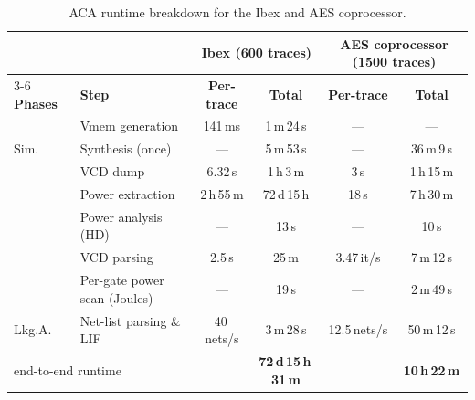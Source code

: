 \documentclass[sigconf]{acmart}
\begin{document}
{
\renewcommand{\arraystretch}{0.9}

\begin{table}[t]
\centering
\setlength{\tabcolsep}{8pt}
\caption{ACA runtime breakdown for the Ibex and AES coprocessor.}
\label{tab:runtime_breakdown_ACA}

\begin{tabular}{l|p{}cccc}%
\hline
\multicolumn{2}{c}{} &
\multicolumn{2}{c}{\textbf{Ibex (600 traces)}} &
\multicolumn{2}{c}{\textbf{AES coprocessor (1500 traces)}} \\
\cline{3-6}
\textbf{Phases} & \textbf{Step} &
\textbf{Per-trace} & \textbf{Total} &
\textbf{Per-trace} & \textbf{Total} \\ \hline

\multirow{3}{*}{Sim.}
& Vmem generation        & 141\,ms      & 1\,m\,24\,s   & —            & — \\
{}
& Synthesis (once)       & —            & 5\,m\,53\,s   & —            & 36\,m\,9\,s \\
{}
& VCD dump               & 6.32\,s      & 1\,h\,3\,m    & 3\,s         & 1\,h\,15\,m \\ \hline
\rowcolor{LightGray}
\multirow{4}{*}{Pwr.\ Est.}
& Power extraction
                         & 2\,h\,55\,m  & 72\,d\,15\,h  & 18\,s        & 7\,h\,30\,m \\
{}
& Power analysis (HD)    & —            & 13\,s         & —            & 10\,s \\
{}
& VCD parsing            & 2.5\,s       & 25\,m         & 3.47\,it/s   & 7\,m\,12\,s \\
{}
& Per-gate power scan (Joules)
                         & —            & 19\,s         & —            & 2\,m\,49\,s \\ \hline

Lkg.A.
& Net-list parsing \& LIF & 40\,nets/s   & 3\,m\,28\,s   & 12.5\,nets/s & 50\,m\,12\,s \\ \hline

\multicolumn{2}{l}{end-to-end runtime}
&  & \textbf{72\,d\,15\,h\,31\,m}
&  & \textbf{10\,h\,22\,m} \\ \hline
\end{tabular}%
\end{table}

}
\end{document}
